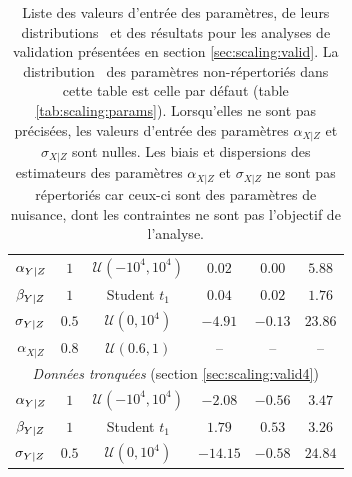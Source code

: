 \begin{table}[t]
\begin{tabular}{c c c c c c}
        \midrule
        $\alpha_{Y|Z}$ & $1   $ & $\mathcal{U}(-10^4, 10^4)$
                       & $0.02$  & $0.00$  & $5.88$ \\
        $\beta_{Y|Z}$  & $1   $ & Student $t_1$
                       & $0.04$  & $0.02$  & $1.76$ \\
        $\sigma_{Y|Z}$ & $0.5 $ & $\mathcal{U}(0, 10^4)$
                       & $-4.91$  & $-0.13$  & $23.86$ \\
        $\alpha_{X|Z}$ & $0.8 $ & $\mathcal{U}(0.6, 1)$ & -- & -- & -- \\
        \midrule
        \multicolumn{6}{c}{\textit{Données tronquées} (section \ref{sec:scaling:valid4})} \\
        \midrule
        $\alpha_{Y|Z}$ & $1   $ & $\mathcal{U}(-10^4, 10^4)$
                       & $-2.08$  & $-0.56$  & $3.47$ \\
        $\beta_{Y|Z}$  & $1   $ & Student $t_1$
                       & $1.79$  & $0.53$  & $3.26$ \\
        $\sigma_{Y|Z}$ & $0.5 $ & $\mathcal{U}(0, 10^4)$
                       & $-14.15$  & $-0.58$  & $24.84$ \\
        \bottomrule
    \end{tabular}
    \caption{%
        Liste des valeurs d'entrée des paramètres, de leurs distributions \prior\ et des résultats pour les analyses de validation présentées en section \ref{sec:scaling:valid}.
        La distribution \prior\ des paramètres non-répertoriés dans cette table est celle par défaut (table \ref{tab:scaling:params}).
        Lorsqu'elles ne sont pas précisées, les valeurs d'entrée des paramètres $\alpha_{X|Z}$ et $\sigma_{X|Z}$ sont nulles.
        Les biais et dispersions des estimateurs des paramètres $\alpha_{X|Z}$ et $\sigma_{X|Z}$ ne sont pas répertoriés car ceux-ci sont des paramètres de nuisance, dont les contraintes ne sont pas l'objectif de l'analyse.
    }
    \label{tab:scaling:valid}
\end{table}


